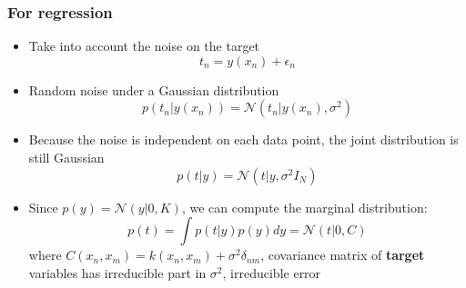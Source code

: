     \subsubsection{For regression}
    \begin{itemize}
        \item Take into account the noise on the target $$t_n=y(x_n)+\epsilon_n$$
        \item Random noise under a Gaussian distribution $$p(t_n|y(x_n))=\mathcal{N}(t_n|y(x_n),\sigma^2)$$
        \item Because the noise is independent on each data point, the joint distribution is still Gaussian $$p(t|y)=\mathcal{N}(t|y,\sigma^2I_N)$$
        \item Since $p(y)=\mathcal{N}(y|0,K)$, we can compute the marginal distribution: $$p(t)=\int p(t|y)p(y)dy=\mathcal{N}(t|0,C)$$ where $C(x_n,x_m)=k(x_n,x_m)+\sigma^2\delta_{nm}$, covariance matrix of \textbf{target} variables has irreducible part in $\sigma^2$, irreducible error
    \end{itemize}
